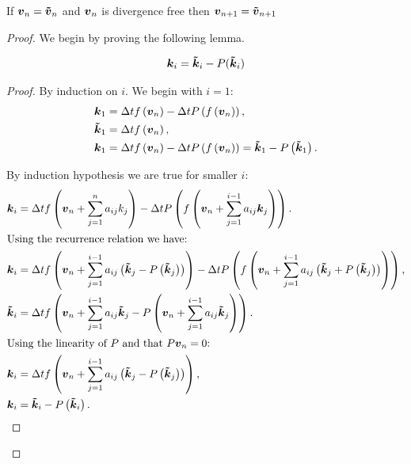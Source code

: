 \begin{theorem}
If ${\boldsymbol {v}}_{n}={\boldsymbol {\tilde{v}}}_{n}$ and ${\boldsymbol {v}}_n$ is divergence free then ${\boldsymbol {v}}_{n+1}={\boldsymbol {\tilde{v}}}_{n+1}$ 
\end{theorem}
\begin{proof}
We begin by proving the following lemma.
\begin{lemma}
\begin{equation}
  {\boldsymbol {k}}_{i}={\boldsymbol {\tilde{k}}}_{i}-P({\boldsymbol {\tilde{k}}}_{i})
\end{equation}
\end{lemma}
\begin{proof}
By induction on $i$.
We begin with $i=1$:
\begin{align}
  {\boldsymbol {k}}_{1}&=\Delta tf\left({\boldsymbol {v}}_n\right)-\Delta tP\left(f\left({\boldsymbol {v}}_n\right)\right),\\
{\boldsymbol {\tilde{k}}}_{1}&=\Delta tf\left({\boldsymbol {v}}_n\right),\\
  {\boldsymbol {k}}_{1}&=\Delta t f\left({\boldsymbol {v}}_n\right)-\Delta tP\left(f\left({\boldsymbol {v}}_n\right)\right)={\boldsymbol {\tilde{k}}}_1-P\left({\boldsymbol {\tilde{k}}}_1\right).
\end{align}

By induction hypothesis we are true for smaller $i$:
\begin{align*}
  {\boldsymbol {k}}_{i}&=\Delta tf\left({\boldsymbol {v}}_n+\sum_{j=1}^{n}a_{ij}k_{j}\right)-\Delta tP\left(f\left({\boldsymbol {v}}_n+\sum_{j=1}^{i-1}a_{ij}{\boldsymbol {k}}_{j}\right)\right).\\
  \intertext{Using the recurrence relation we have:}
  {\boldsymbol {k}}_{i}&=\Delta tf\left({\boldsymbol {v}}_n+\sum_{j=1}^{i-1}a_{ij}\left({\boldsymbol {\tilde{k}}}_{j}-P\left({\boldsymbol {\tilde{k}}}_{j}\right)\right)\right)-\Delta tP\left(f\left({\boldsymbol {v}}_n+\sum_{j=1}^{i-1}a_{ij}\left({\boldsymbol {\tilde{k}}}_{j}+P\left({\boldsymbol {\tilde{k}}}_{j}\right)\right)\right)\right),\\
  {\boldsymbol {\tilde{k}}}_{i}&=\Delta tf\left({\boldsymbol {v}}_n+\sum_{j=1}^{i-1}a_{ij}{\boldsymbol {\tilde{k}}}_{j}-P\left({\boldsymbol {v}}_n+\sum_{j=1}^{i-1}a_{ij}{\boldsymbol {\tilde{k}}}_{j}\right)\right).\\
  \intertext{Using the linearity of $P$ and that $P{\boldsymbol {v}}_{n}=0$:}
  {\boldsymbol {k}}_{i}&=\Delta tf\left({\boldsymbol {v}}_n+\sum_{j=1}^{i-1}a_{ij}\left({\boldsymbol {\tilde{k}}}_{j}-P\left({\boldsymbol {\tilde{k}}}_{j}\right)\right)\right),\\
  {\boldsymbol {k}}_{i}&={\boldsymbol {\tilde{k}}}_{i}-P\left({\boldsymbol {\tilde{k}}}_{i}\right).
\end{align*}
\end{proof}


\end{proof}
